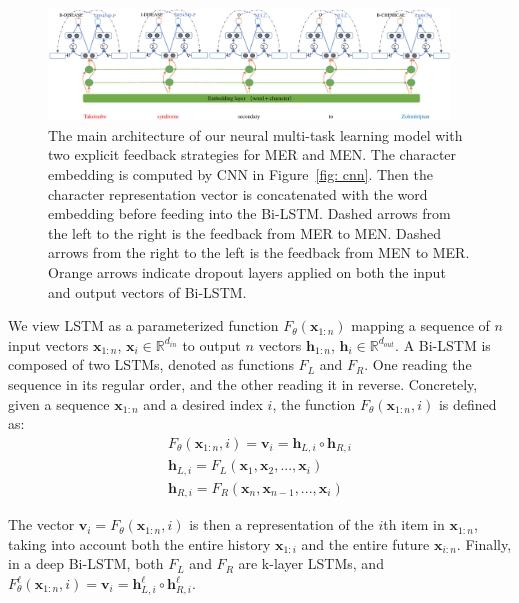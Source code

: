 \begin{figure}[tp]
	\centering
	\includegraphics[width=0.95\textwidth]{fig/model}
	\vspace{-0.1in}	
	\caption{The main architecture of our neural
		multi-task learning model with two explicit feedback strategies for MER and MEN. The character embedding is computed by CNN in Figure~\ref{fig: cnn}.  Then
		the character representation vector is concatenated
		with the word embedding before feeding into the
		Bi-LSTM. Dashed arrows from the left to the  right is the feedback from MER to MEN.  Dashed arrows from the right to the left is the feedback from MEN to MER. Orange arrows indicate dropout
		layers applied on both the input and output vectors
		of Bi-LSTM. }\label{fig: model}
	\vspace{-0.15in}	
\end{figure}

We view LSTM as a parameterized function $F_{\theta}(\mathbf{x}_{1:n})$ mapping a sequence of $n$ input vectors $\mathbf{x}_{1:n}$, $\mathbf{x}_i\in \mathbb{R}^{d_{in}} $ to output $n$ vectors $\mathbf{h}_{1:n}$, $\mathbf{h}_i \in \mathbb{R}^{d_{out}}$.
A Bi-LSTM is composed of two LSTMs, denoted as functions $F_L$ and $F_R$. One reading the sequence in its regular order, and the other reading it in reverse. Concretely, given a sequence $\mathbf{x}_{1:n}$ and
a desired index $i$, the function $F_{\theta}(\mathbf{x}_{1:n},i)$
is defined as:
\begin{equation*}
\begin{split}
F_{\theta}(\mathbf{x}_{1:n},i) = \mathbf{v}_i = \mathbf{h}_{L,i}\circ \mathbf{h}_{R,i}\\
\mathbf{h}_{L,i} = F_L(\mathbf{x}_1, \mathbf{x}_2, ..., \mathbf{x}_i)\\
\mathbf{h}_{R,i} = F_R(\mathbf{x}_n, \mathbf{x}_{n-1}, ..., \mathbf{x}_i)
\end{split}
\end{equation*}

The vector $\mathbf{v}_i = F_{\theta}(\mathbf{x}_{1:n},i)$ is then a representation of the $i$th item in $\mathbf{x}_{1:n}$, taking into account both the entire history $\mathbf{x}_{1:i}$ and the entire future $\mathbf{x}_{i:n}$.
Finally, in a deep Bi-LSTM, both $F_L$ and $F_R$ are k-layer LSTMs, and $F_{\theta}^{\ell}(\mathbf{x}_{1:n},i)= \mathbf{v}_i = \mathbf{h}_{L,i}^{\ell}\circ \mathbf{h}_{R,i}^{\ell}$.

